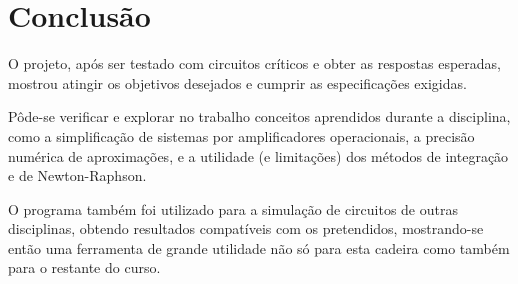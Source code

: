 \documentclass[11pt,titlepage]{article}
\begin{document}
\newpage
\section{Conclusão}

O projeto, após ser testado com circuitos \textquotedbl críticos\textquotedbl{} e obter as respostas esperadas, mostrou atingir os objetivos desejados e cumprir as especificações exigidas.

Pôde-se verificar e explorar no trabalho conceitos aprendidos durante a disciplina, como a simplificação de sistemas por amplificadores operacionais, a precisão numérica de aproximações, e a utilidade (e limitações) dos métodos de integração e de Newton-Raphson.

O programa também foi utilizado para a simulação de circuitos de outras disciplinas, obtendo resultados compatíveis com os pretendidos, mostrando-se então uma ferramenta de grande utilidade não só para esta cadeira como também para o restante do curso.



\end{document}
